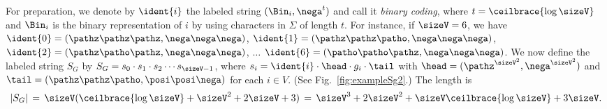 For preparation,
we denote by $\ident{i}$ the labeled string $(\Bin_i, \nega^t)$ and call it {\em binary coding},
where $t=\ceilbrace{\log{\sizeV}}$ and $\Bin_i$ is the binary representation of $i$ by using characters in $\Sigma$ of length $t$.
For instance, if $\sizeV=6$, we have 
$\ident{0} = (\pathz\pathz\pathz, \nega\nega\nega)$, 
$\ident{1} = (\pathz\pathz\patho, \nega\nega\nega)$, 
$\ident{2} = (\pathz\patho\pathz, \nega\nega\nega)$, 
$\ldots$ 
$\ident{6} = (\patho\patho\pathz, \nega\nega\nega)$.
We now define the labeled string $S_G$ by
$S_G = s_0 \cdot s_1 \cdot s_2 \cdots s_{\sizeV-1}$,
where $s_i = \ident{i}\cdot\head\cdot g_i \cdot \tail$ with $\head = (\pathz^{\sizeV^2}, \nega^{\sizeV^2})$ and $\tail =
(\pathz\pathz\patho,\posi\posi\nega)$ for each $i \in V$.
(See Fig.~\ref{fig:exampleSg2}.)
The length is
\[
 |S_G| \, = \, \sizeV( \ceilbrace{\log{\sizeV}} + \sizeV^2 + 2\sizeV + 3) 
  \, = \, \sizeV^3 + 2\sizeV^2 + \sizeV\ceilbrace{\log{\sizeV}} + 3\sizeV.
\]
%
%
%
